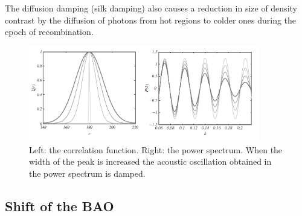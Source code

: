 The diffusion damping (silk damping)  also causes a reduction in size of density contrast by the diffusion of photons from 
hot regions to colder ones during the epoch of recombination. 

\begin{figure}[htbp]
       \centering
               \includegraphics[width=0.9\textwidth]{Images/chapter2/width.png}
       \caption{\small Left: the correlation function. Right: the power spectrum. When the width of the peak is increased the acoustic oscillation obtained in the power spectrum is damped.    }
       \label{peak}
 \end{figure}

\subsection{ Shift of the BAO }
\label{shiftBAO}


